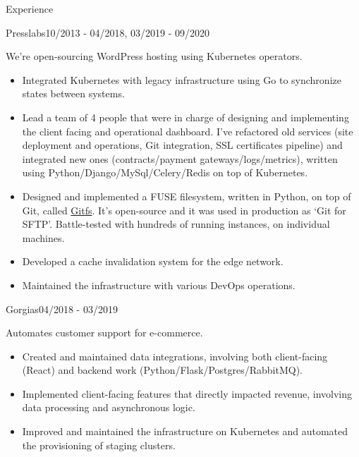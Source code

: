 \documentclass{resume}
\begin{document}
\begin{rSection}{Experience}
    \begin{rSubsection}{Presslabs}{10/2013 - 04/2018, 03/2019 - 09/2020}{}{}
        \item We’re open-sourcing WordPress hosting using Kubernetes operators.
        \begin{itemize}
            \setlength\itemsep{-0.3em}
            \item Integrated Kubernetes with legacy infrastructure using Go to synchronize states between systems.
            \item Lead a team of 4 people that were in charge of designing and implementing the client facing and operational dashboard. I’ve refactored old services (site deployment and operations, Git integration, SSL certificates pipeline) and integrated new ones (contracts/payment gateways/logs/metrics), written using Python/Django/MySql/Celery/Redis on top of Kubernetes.
            \item Designed and implemented a FUSE filesystem, written in Python, on top of Git, called \href{https://github.com/presslabs/gitfs.git}{Gitfs}. It’s open-source and it was used in production as ‘Git for SFTP’. Battle-tested with hundreds of running instances, on individual machines.
            \item Developed a cache invalidation system for the edge network.
            \item Maintained the infrastructure with various DevOps operations.
        \end{itemize}
    \end{rSubsection}

    \begin{rSubsection}{Gorgias}{04/2018 - 03/2019}{}{}
        \item Automates customer support for e-commerce.
        \begin{itemize}
            \setlength\itemsep{-0.3em}
	    \item Created and maintained data integrations, involving both client-facing (React) and backend work (Python/Flask/Postgres/RabbitMQ).
            \item Implemented client-facing features that directly impacted revenue, involving data processing and asynchronous logic.
            \item Improved and maintained the infrastructure on Kubernetes and automated the provisioning of staging clusters.
        \end{itemize}
    \end{rSubsection}


\end{rSection}
\end{document}

